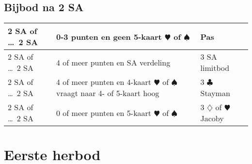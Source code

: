 \documentclass[12pt,a4paper]{report}
\begin{document}
\section{Bijbod na 2 SA}
\begin{tabular}{|p{2cm}|p{5cm}|p{3cm}|}
	\hline
	2 SA\newline
	of \dots \ 2 SA 
	& 0-3 punten\newline
	  en geen 5-kaart $\varheartsuit$ of $\spadesuit$
    & Pas \\
    \hline
    
    2 SA\newline
    of \dots \ 2 SA
    & 4 of meer punten\newline
      en SA verdeling
    & 3 SA \newline
      limitbod\\
    \hline
    
    2 SA\newline
    of \dots \ 2 SA
    & 4 of meer punten\newline
      en 4-kaart $\varheartsuit$ of $\spadesuit$ \newline
      vraagt naar 4- of 5-kaart hoog
    & 3 $\clubsuit$ Stayman\\
    \hline
    
    2 SA\newline
    of \dots \ 2 SA
    & 0 of meer punten\newline
    en 5-kaart $\varheartsuit$ of $\spadesuit$
    & 3 $\diamondsuit$ of $\varheartsuit$ Jacoby\\
    \hline  
\end{tabular}


\chapter{Eerste herbod}
\end{document}

